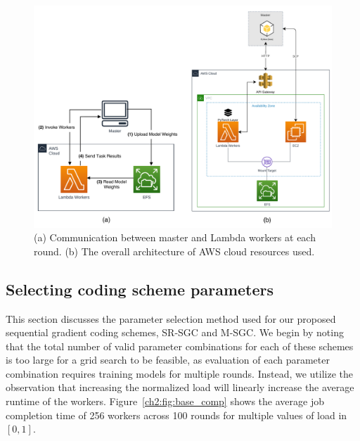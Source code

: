 \begin{figure}[t]
    \centering
    \includegraphics[width=\textwidth]{figs/ch2/aws.pdf}
    \caption{(a) Communication between master and Lambda workers at each round. (b) The overall architecture of AWS cloud resources used.}
    \label{ch2:fig:aws}
\end{figure}

\FloatBarrier


\subsection{Selecting coding scheme parameters}\label{ch2:sec:param_selection}

This section discusses the parameter selection method used for our proposed sequential gradient coding schemes, SR-SGC and M-SGC. We begin by noting that the total number of valid parameter combinations for each of these schemes is too large for a grid search to be feasible, as evaluation of each parameter combination requires training models for multiple rounds. Instead, we utilize the observation that increasing the normalized load will linearly increase the average runtime of the workers. 
Figure~\ref{ch2:fig:base_comp} shows the average job completion time of 256 workers across 100 rounds for multiple values of load in $[0, 1]$. 

